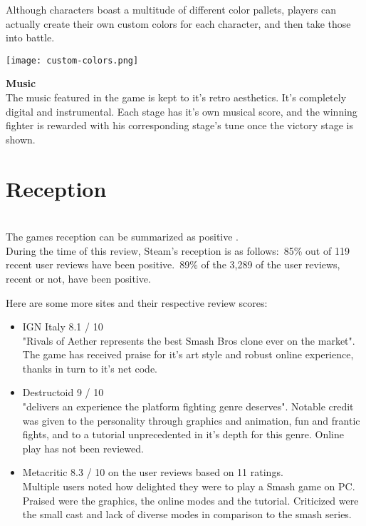 \documentclass{article}
\begin{document}
Although characters boast a multitude of different color pallets, players can actually create their own custom colors for each character, and then take those into battle.\\

\begin{center}
\texttt{[image: custom-colors.png]}
\end{center}

\textbf{Music}\\
The music featured in the game is kept to it's retro aesthetics. It's completely digital and instrumental. Each stage has it's own musical score, and the winning fighter is rewarded with his corresponding stage's tune once the victory stage is shown.\\

\chapter{\textbf{Reception}}\\

The games reception can be summarized as positive \cite{steam:6}.\\
During the time of this review, Steam's reception is as follows:\
85\% out of 119 recent user reviews have been positive.\
89\% of the 3,289 of the user reviews, recent or not, have been positive.\


Here are some more sites and their respective review scores: \cite{metacritic:7} %

\begin{itemize}
\item IGN Italy 8.1 / 10\\
"Rivals of Aether represents the best Smash Bros clone ever on the market". The game has received praise for it's art style and robust online experience, thanks in turn to it's net code. \cite{IGN:15}\\
\item Destructoid 9 / 10\\
"delivers an experience the platform fighting genre deserves". Notable credit was given to the personality through graphics and animation, fun and frantic fights, and to a tutorial unprecedented in it's depth for this genre. Online play has not been reviewed. \cite{nickvaldez2017:16}\\
\item Metacritic 8.3 / 10 on the user reviews based on 11 ratings.\\
Multiple users noted how delighted they were to play a Smash game on PC. Praised were the graphics, the online modes and the tutorial. Criticized were the small cast and lack of diverse modes in comparison to the smash series. \cite{metacritic:7}\\ %
\end{itemize}
\end{document}
